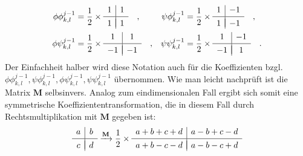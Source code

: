 \documentclass{article}
\begin{document}
\begin{align*}
\phi\phi_{k,l}^{j-1} &=
\frac{1}{2} \times
\begin{array}{c|c}
1 & 1 \\[.05cm] 
\hline \\[-0.35cm]
1 & 1
\end{array}
\quad , &
\psi\phi_{k,l}^{j-1} &=
\frac{1}{2} \times
\begin{array}{c|c}
1 & -1 \\[.05cm] 
\hline \\[-0.35cm]
1 & -1
\end{array}
\quad , \\
\phi\psi_{k,l}^{j-1} &=
\frac{1}{2} \times
\begin{array}{c|c}
1 & 1 \\[.05cm] 
\hline \\[-0.35cm]
-1 & -1
\end{array}
\quad , &
\psi\psi_{k,l}^{j-1} &=
\frac{1}{2} \times
\begin{array}{c|c}
1 & -1 \\[.05cm] 
\hline \\[-0.35cm]
-1 & 1
\end{array}
\quad .
\end{align*}
%
Der Einfachheit halber wird diese Notation auch für die Koeffizienten bzgl. $\phi\phi_{k,l}^{j-1}, \psi\phi_{k,l}^{j-1}, \phi\psi_{k,l}^{j-1}, \psi\psi_{k,l}^{j-1}$ übernommen.
%
Wie man leicht nachprüft ist die Matrix $\mathbf{M}$ selbsinvers. Analog zum eindimensionalen Fall ergibt sich somit eine symmetrische Koeffiziententransformation, die in diesem Fall durch Rechtsmultiplikation mit $\mathbf{M}$ gegeben ist:
%
\[
\begin{array}{c|c}
a & b \\[.05cm] 
\hline \\[-0.35cm]
c & d
\end{array}
\xrightarrow[]{\mathbf{M}}
\frac{1}{2} \times
\begin{array}{c|c}
a+b+c+d & a-b+c-d \\[.05cm] 
\hline \\[-0.35cm]
a+b-c-d & a-b-c+d
\end{array}
\]
%
%
\end{document}
